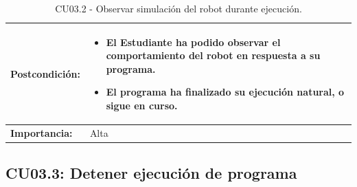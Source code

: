 \begin{table}[H]
\begin{tabularx}{\linewidth}{|p{3cm}|X|}
		\hline
		\textbf{Postcondición:} & 
		\begin{itemize}
			\item El Estudiante ha podido observar el comportamiento del robot en respuesta a su programa.
			\item El programa ha finalizado su ejecución natural, o sigue en curso.
		\end{itemize} \\
		\hline
		\textbf{Importancia:} & Alta \\
		\hline
	\end{tabularx}
	\caption{CU03.2 - Observar simulación del robot durante ejecución.}
	\label{tabla:CU03_2_ObservarSimulacion}
\end{table}

\subsection{CU03.3: Detener ejecución de programa} \label{sec:CU03_3_DetenerEjecucion}
